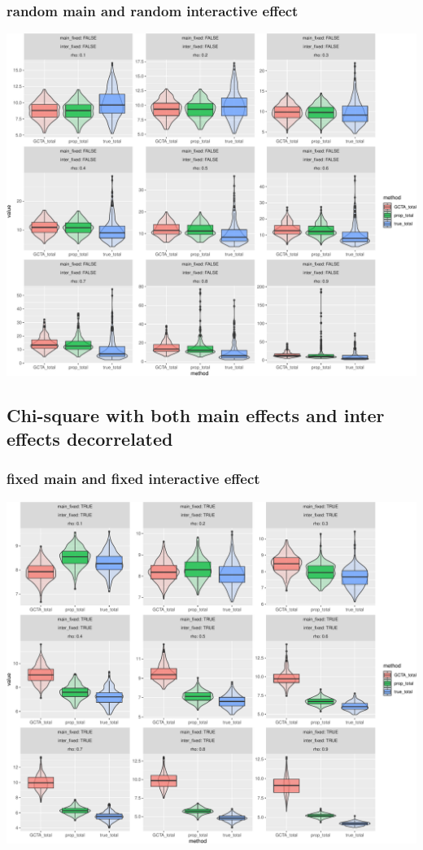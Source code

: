 \documentclass[]{article}
\begin{document}
\subsubsection{random main and random interactive
effect}\label{random-main-and-random-interactive-effect}

\includegraphics{block_decorrelation_report_files/figure-latex/random random only main-1.pdf}

\subsection{Chi-square with both main effects and inter effects
decorrelated}\label{chi-square-with-both-main-effects-and-inter-effects-decorrelated}

\subsubsection{fixed main and fixed interactive
effect}\label{fixed-main-and-fixed-interactive-effect-1}

\includegraphics{block_decorrelation_report_files/figure-latex/fixed fixed both main and inter-1.pdf}
\end{document}
